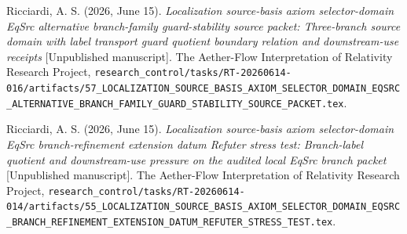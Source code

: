 \documentclass[11pt]{article}
\begin{document}
Ricciardi, A. S. (2026, June 15). \emph{Localization source-basis axiom
selector-domain EqSrc alternative branch-family guard-stability source
packet: Three-branch source domain with label transport guard quotient
boundary relation and downstream-use receipts} [Unpublished
manuscript]. The Aether-Flow Interpretation of Relativity Research
Project,
\texttt{research\_control/tasks/RT-20260614-016/artifacts/57\_LOCALIZATION\_SOURCE\_BASIS\_AXIOM\_SELECTOR\_DOMAIN\_EQSRC\_ALTERNATIVE\_BRANCH\_FAMILY\_GUARD\_STABILITY\_SOURCE\_PACKET.tex}.

Ricciardi, A. S. (2026, June 15). \emph{Localization source-basis axiom
selector-domain EqSrc branch-refinement extension datum Refuter stress
test: Branch-label quotient and downstream-use pressure on the audited
local EqSrc branch packet} [Unpublished manuscript]. The Aether-Flow
Interpretation of Relativity Research Project,
\texttt{research\_control/tasks/RT-20260614-014/artifacts/55\_LOCALIZATION\_SOURCE\_BASIS\_AXIOM\_SELECTOR\_DOMAIN\_EQSRC\_BRANCH\_REFINEMENT\_EXTENSION\_DATUM\_REFUTER\_STRESS\_TEST.tex}.
\end{document}
